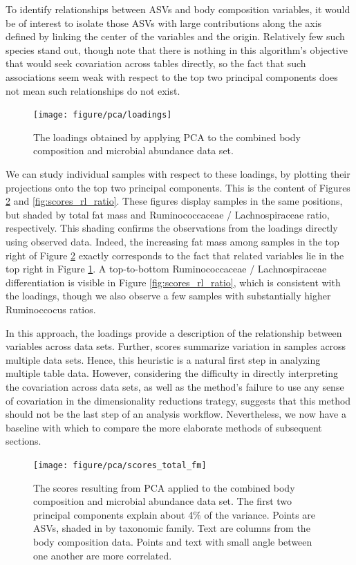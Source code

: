 \documentclass[14pt]{extarticle}
\begin{document}
To identify relationships between ASVs and body composition variables, it would
be of interest to isolate those ASVs with large contributions along the axis
defined by linking the center of the  variables and the origin. Relatively
few such species stand out, though note that there is nothing in this
algorithm's objective that would seek covariation across tables directly, so the
fact that such associations seem weak with respect to the top two principal
components does not mean such relationships do not exist.

\begin{figure}
  \centering
  \texttt{[image: figure/pca/loadings]}
  \caption{The loadings obtained by applying PCA to the combined body
    composition and microbial abundance data set. \label{fig:loadings} }
\end{figure}

We can study individual samples with respect to these loadings, by plotting
their projections onto the top two principal components. This is the content of
Figures \ref{fig:scores_total_fm} and \ref{fig:scores_rl_ratio}. These figures
display samples in the same positions, but shaded by total fat mass and Ruminococcaceae
/ Lachnospiraceae ratio, respectively. This shading confirms the observations
from the loadings directly using observed data. Indeed, the increasing fat mass
among samples in the top right of Figure \ref{fig:scores_total_fm} exactly
corresponds to the fact that  related variables lie in the top right in
Figure \ref{fig:loadings}. A top-to-bottom Ruminococcaceae /
Lachnospiraceae differentiation is visible in Figure \ref{fig:scores_rl_ratio},
which is consistent with the loadings, though we also observe a few samples with
substantially higher Ruminoccocus ratios.

In this approach, the loadings provide a description of the relationship between
variables across data sets. Further, scores summarize variation in samples
across multiple data sets. Hence, this heuristic is a natural first step in
analyzing multiple table data. However, considering the difficulty in directly
interpreting the covariation across data sets, as well as the method's failure
to use any sense of covariation in the dimensionality reductions trategy,
suggests that this method should not be the last step of an analysis workflow.
Nevertheless, we now have a baseline with which to compare the more elaborate
methods of subsequent sections.

\begin{figure}
  \centering
  \texttt{[image: figure/pca/scores\_total\_fm]}
  \caption{The scores resulting from PCA applied to the combined body
    composition and microbial abundance data set. The first two principal
    components explain about 4\% of the variance. Points are ASVs, shaded in by
    taxonomic family. Text are columns from the body composition data. Points
    and text with small angle between one another are more correlated.
    \label{fig:scores_total_fm} }
\end{figure}
\end{document}
